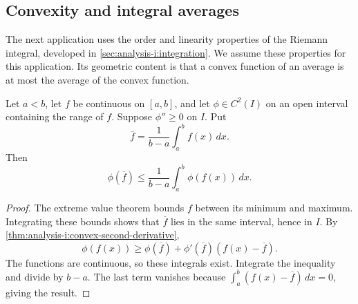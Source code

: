 \subsection{Convexity and integral averages}
The next application uses the order and linearity properties of the
Riemann integral, developed in
\autoref{sec:analysis-i:integration}. We assume these properties
for this application. Its geometric content is that a convex function
of an average is at most the average of the convex function.
\begin{theorem}
  \label{thm:analysis-i:jensen-integral}
  Let $a<b$, let $f$ be continuous on $[a,b]$, and let
  $\phi\in C^2(I)$ on an open interval containing the range of $f$.
  Suppose $\phi''\ge0$ on $I$. Put
  \[
    \overline f=\frac1{b-a}\int_a^b f(x)\,dx.
  \]
  Then
  \[
    \phi(\overline f)\le\frac1{b-a}\int_a^b\phi(f(x))\,dx.
  \]
\end{theorem}
\begin{proof}
  The extreme value theorem bounds $f$ between its minimum and maximum.
  Integrating these bounds shows that $\overline f$ lies in the same
  interval, hence in $I$. By
  \autoref{thm:analysis-i:convex-second-derivative},
  \[
    \phi(f(x))\ge\phi(\overline f)
      +\phi'(\overline f)(f(x)-\overline f).
  \]
  The functions are continuous, so these integrals exist. Integrate
  the inequality and divide by $b-a$. The last term vanishes because
  $\int_a^b(f(x)-\overline f)\,dx=0$, giving the result.
\end{proof}
